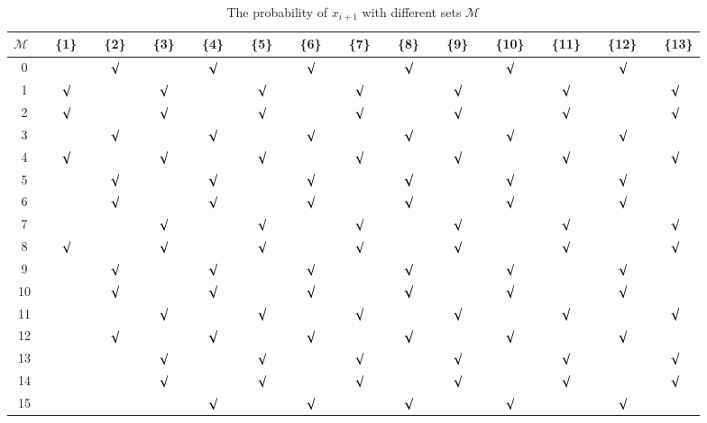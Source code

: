 \begin{table}
\renewcommand{\arraystretch}{1.3}
\caption{The probability of $x_{i+1}$ with different sets $\mathcal{M}$}
\label{The probability}
\centering
\begin{tabular}{cc@{}c@{}c@{}c@{}c@{}c@{}c@{}c@{}c@{}c@{}c@{}c@{}c}\toprule
$\mathcal{M}$~&~\{1\}~&~\{2\}~&~\{3\}~&~\{4\}~&~\{5\}~&~\{6\}~&~\{7\}~&~\{8\}~&~\{9\}~&~\{10\}~&~\{11\}~&~\{12\}~&~\{13\} \\\hline
0	&	&$\surd$&	&$\surd$&	&$\surd$& 	&$\surd$& 	&$\surd$& 	&$\surd$& 	\\
1 	&$\surd$&	&$\surd$&	&$\surd$&	&$\surd$& 	&$\surd$& 	&$\surd$& 	&$\surd$\\
2 	&$\surd$&	&$\surd$&	&$\surd$&	&$\surd$& 	&$\surd$& 	&$\surd$& 	&$\surd$\\
3	&	&$\surd$&	&$\surd$&	&$\surd$& 	&$\surd$& 	&$\surd$& 	&$\surd$& 	\\
4 	&$\surd$&	&$\surd$&	&$\surd$&	&$\surd$& 	&$\surd$& 	&$\surd$& 	&$\surd$\\
5	&	&$\surd$&	&$\surd$&	&$\surd$& 	&$\surd$& 	&$\surd$& 	&$\surd$& 	\\
6	&	&$\surd$&	&$\surd$&	&$\surd$& 	&$\surd$& 	&$\surd$& 	&$\surd$& 	\\
7	&  	&	&$\surd$&	&$\surd$&	&$\surd$& 	&$\surd$& 	&$\surd$& 	&$\surd$\\
8	&$\surd$&	&$\surd$&	&$\surd$&	&$\surd$& 	&$\surd$& 	&$\surd$& 	&$\surd$\\
9	&	&$\surd$&	&$\surd$&	&$\surd$& 	&$\surd$& 	&$\surd$& 	&$\surd$& 	\\
10	&	&$\surd$&	&$\surd$&	&$\surd$& 	&$\surd$& 	&$\surd$& 	&$\surd$& 	\\
11	&  	&	&$\surd$&	&$\surd$&	&$\surd$& 	&$\surd$& 	&$\surd$& 	&$\surd$\\
12	&	&$\surd$&	&$\surd$&	&$\surd$& 	&$\surd$& 	&$\surd$& 	&$\surd$& 	\\
13	&  	&	&$\surd$&	&$\surd$&	&$\surd$& 	&$\surd$& 	&$\surd$& 	&$\surd$\\
14	&  	&	&$\surd$&	&$\surd$&	&$\surd$& 	&$\surd$& 	&$\surd$& 	&$\surd$\\
15	&	&  	&	&$\surd$&	&$\surd$& 	&$\surd$& 	&$\surd$& 	&$\surd$& 	\\
\bottomrule
\end{tabular}
\end{table}
	 

